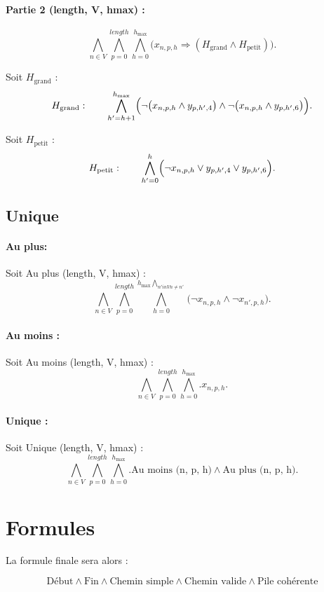 \documentclass{article}
\begin{document}
\paragraph{Partie 2 (length, V, hmax) :}
\[
\bigwedge_{n\in V}\bigwedge_{p=0}^{length}\bigwedge_{h=0}^{h_{\max}}
\bigl( x_{n,p,h} \Rightarrow (H_{\text{grand}} \land H_{\text{petit}}) \bigr).
\]

\noindent
Soit $H_{\text{grand}}$ :
\[
H_{\text{grand}}:\qquad
\bigwedge_{h'=h+1}^{h_{\max}} \Bigl( \lnot\bigl(x_{n,p,h} \land y_{p,h',4}\bigr) \land \lnot\bigl(x_{n,p,h} \land y_{p,h',6}\bigr) \Bigr).
\]

\noindent
Soit $H_{\text{petit}}$ :
\[
H_{\text{petit}}:\qquad
\bigwedge_{h'=0}^{h} \Bigl( \lnot x_{n,p,h} \lor y_{p,h',4} \lor y_{p,h',6} \Bigr).
\]

\subsection{Unique}

\paragraph{Au plus:}
Soit Au plus (length, V, hmax) :
\[
\bigwedge_{n\in V}\bigwedge_{p=0}^{length}\bigwedge_{h=0}^{h_{\max}\bigwedge_{n' in V n \neq n'}}
\bigl( \lnot x_{n,p,h} \land \lnot x_{n',p,h} \bigr).
\]

\paragraph{Au moins :}
Soit Au moins (length, V, hmax) :
\[
\bigwedge_{n\in V}\bigwedge_{p=0}^{length}\bigwedge_{h=0}^{h_{\max}}.
x_{n,p,h}.
\]

\paragraph{Unique :}
Soit Unique (length, V, hmax) :
\[
\bigwedge_{n\in V}\bigwedge_{p=0}^{length}\bigwedge_{h=0}^{h_{\max}}.
\text{Au moins (n, p, h)} \land \text{Au plus (n, p, h)}.
\]

\section{Formules}

La formule finale sera alors :

\[
\text{Début} \land \text{Fin} \land \text{Chemin simple} \land \text{Chemin valide} \land \text{Pile cohérente}
\]
\end{document}
